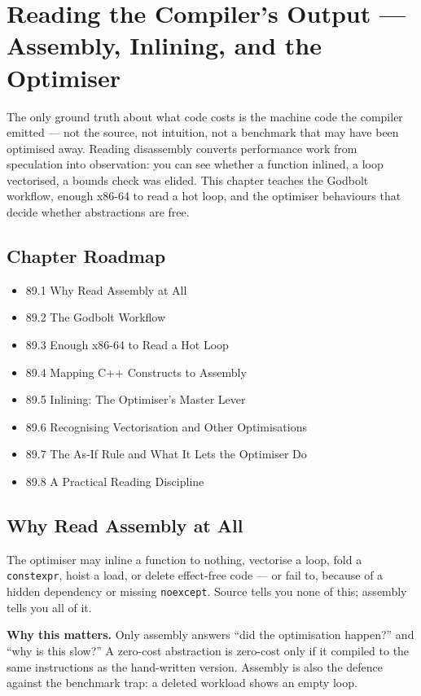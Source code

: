 \chapter{Reading the Compiler's Output --- Assembly, Inlining, and the Optimiser}

The only ground truth about what code costs is the machine code the compiler emitted --- not the source, not intuition, not a benchmark that may have been optimised away. Reading disassembly converts performance work from speculation into observation: you can see whether a function inlined, a loop vectorised, a bounds check was elided. This chapter teaches the Godbolt workflow, enough x86-64 to read a hot loop, and the optimiser behaviours that decide whether abstractions are free.

\section*{Chapter Roadmap}
\begin{itemize}
\item 89.1 Why Read Assembly at All
\item 89.2 The Godbolt Workflow
\item 89.3 Enough x86-64 to Read a Hot Loop
\item 89.4 Mapping C++ Constructs to Assembly
\item 89.5 Inlining: The Optimiser's Master Lever
\item 89.6 Recognising Vectorisation and Other Optimisations
\item 89.7 The As-If Rule and What It Lets the Optimiser Do
\item 89.8 A Practical Reading Discipline
\end{itemize}

\section{Why Read Assembly at All}
The optimiser may inline a function to nothing, vectorise a loop, fold a \texttt{constexpr}, hoist a load, or delete effect-free code --- or fail to, because of a hidden dependency or missing \texttt{noexcept}. Source tells you none of this; assembly tells you all of it.

\textbf{Why this matters.} Only assembly answers ``did the optimisation happen?'' and ``why is this slow?'' A zero-cost abstraction is zero-cost only if it compiled to the same instructions as the hand-written version. Assembly is also the defence against the benchmark trap: a deleted workload shows an empty loop.

